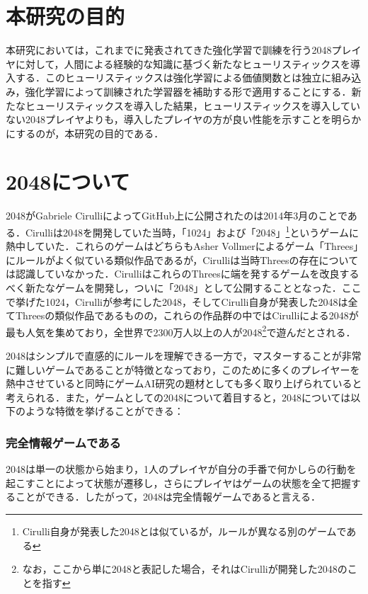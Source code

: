 \documentclass{suribt}
\begin{document}
\section{本研究の目的}
本研究においては，これまでに発表されてきた強化学習で訓練を行う2048プレイヤに対して，人間による経験的な知識に基づく新たなヒューリスティックスを導入する．このヒューリスティックスは強化学習による価値関数とは独立に組み込み，強化学習によって訓練された学習器を補助する形で適用することにする．新たなヒューリスティックスを導入した結果，ヒューリスティックスを導入していない2048プレイヤよりも，導入したプレイヤの方が良い性能を示すことを明らかにするのが，本研究の目的である．

\section{2048について}
2048がGabriele CirulliによってGitHub上に公開されたのは2014年3月のことである．\cite{BusinessInsider}Cirulliは2048を開発していた当時，「1024」および「2048」\footnote{Cirulli自身が発表した2048とは似ているが，ルールが異なる別のゲームである}というゲームに熱中していた．\cite{CirulliMedium}これらのゲームはどちらもAsher Vollmerによるゲーム「Threes」にルールがよく似ている類似作品であるが，Cirulliは当時Threesの存在については認識していなかった．CirulliはこれらのThreesに端を発するゲームを改良するべく新たなゲームを開発し，ついに「2048」として公開することとなった．ここで挙げた1024，Cirulliが参考にした2048，そしてCirulli自身が発表した2048は全てThreesの類似作品であるものの，これらの作品群の中ではCirulliによる2048が最も人気を集めており，全世界で2300万人以上の人が2048\footnote{なお，ここから単に2048と表記した場合，それはCirulliが開発した2048のことを指す}で遊んだとされる．\cite{CirulliMedium}

2048はシンプルで直感的にルールを理解できる一方で，マスターすることが非常に難しいゲームであることが特徴となっており，このために多くのプレイヤーを熱中させていると同時にゲームAI研究の題材としても多く取り上げられていると考えられる．また，ゲームとしての2048について着目すると，2048については以下のような特徴を挙げることができる：

\subsubsection{完全情報ゲームである}
2048は単一の状態から始まり，1人のプレイヤが自分の手番で何かしらの行動を起こすことによって状態が遷移し，さらにプレイヤはゲームの状態を全て把握することができる．したがって，2048は完全情報ゲームであると言える．
\end{document}
